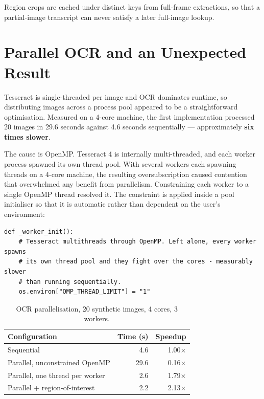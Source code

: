 \documentclass[12pt,oneside]{report}
\begin{document}
Region crops are cached under distinct keys from full-frame extractions, so
that a partial-image transcript can never satisfy a later full-image lookup.

\section{Parallel OCR and an Unexpected Result}
\label{sec:parallel}

Tesseract is single-threaded per image and OCR dominates runtime, so
distributing images across a process pool appeared to be a straightforward
optimisation. Measured on a 4-core machine, the first implementation processed
20 images in 29.6 seconds against 4.6 seconds sequentially --- approximately
\textbf{six times slower}.

The cause is OpenMP. Tesseract 4 is internally multi-threaded, and each worker
process spawned its own thread pool. With several workers each spawning threads
on a 4-core machine, the resulting oversubscription caused contention that
overwhelmed any benefit from parallelism. Constraining each worker to a single
OpenMP thread resolved it. The constraint is applied inside a pool initialiser
so that it is automatic rather than dependent on the user's environment:

\begin{lstlisting}[caption={Without this initialiser, parallelisation is a large performance regression.}]
def _worker_init():
    # Tesseract multithreads through OpenMP. Left alone, every worker spawns
    # its own thread pool and they fight over the cores - measurably slower
    # than running sequentially.
    os.environ["OMP_THREAD_LIMIT"] = "1"
\end{lstlisting}

\begin{table}[h]
\centering
\caption{OCR parallelisation, 20 synthetic images, 4 cores, 3 workers.}
\begin{tabular}{@{}lrr@{}}
\toprule
\textbf{Configuration} & \textbf{Time (s)} & \textbf{Speedup} \\
\midrule
Sequential & 4.6 & 1.00$\times$ \\
Parallel, unconstrained OpenMP & 29.6 & 0.16$\times$ \\
Parallel, one thread per worker & 2.6 & 1.79$\times$ \\
Parallel + region-of-interest & 2.2 & 2.13$\times$ \\
\bottomrule
\end{tabular}
\end{table}
\end{document}
